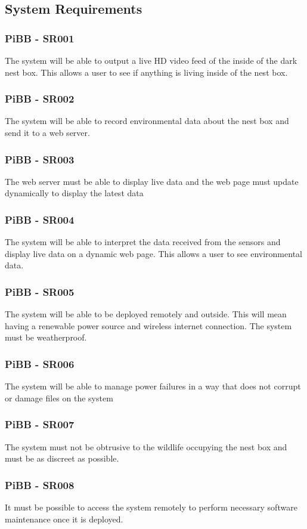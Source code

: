 \documentclass[10pt,a4paper]{article}
\begin{document}
\subsection{System Requirements}
\subsubsection{PiBB - SR001}
The system will be able to output a live HD video feed of the inside of the dark nest box. This allows a user to see if anything is living inside of the nest box.
\subsubsection{PiBB - SR002}
The system will be able to record environmental data about the nest box and send it to a web server.
\subsubsection{PiBB - SR003}
The web server must be able to display live data and the web page must update dynamically to display the latest data
\subsubsection{PiBB - SR004}
The system will be able to interpret the data received from the sensors and display live data on a dynamic web page. This allows a user to see environmental data.
\subsubsection{PiBB - SR005}
The system will be able to be deployed remotely and outside. This will mean having a renewable power source and wireless internet connection. The system must be weatherproof.
\subsubsection{PiBB - SR006}
The system will be able to manage power failures in a way that does not corrupt or damage files on the system
\subsubsection{PiBB - SR007}
The system must not be obtrusive to the wildlife occupying the nest box and must be as discreet as possible. 
\subsubsection{PiBB - SR008}
It must be possible to access the system remotely to perform necessary software maintenance once it is deployed. 
\end{document}
